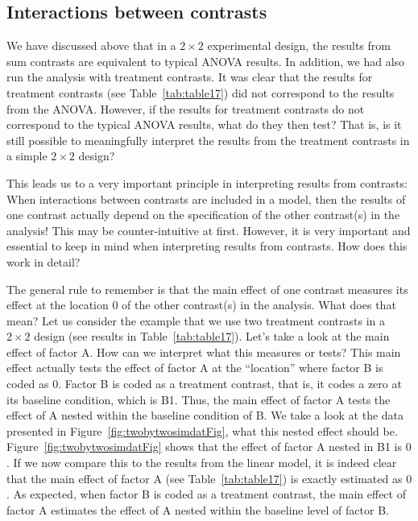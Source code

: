 \documentclass[
  12pt,
]{krantz}
\theoremstyle{definition}
\theoremstyle{definition}
\theoremstyle{definition}
\theoremstyle{definition}
\theoremstyle{remark}
\begin{document}
\hypertarget{interactions-between-contrasts}{%
\subsection{Interactions between contrasts}\label{interactions-between-contrasts}}

We have discussed above that in a \(2 \times 2\) experimental design, the results from sum contrasts are equivalent to typical ANOVA results. In addition, we had also run the analysis with treatment contrasts. It was clear that the results for treatment contrasts (see Table~\ref{tab:table17}) did not correspond to the results from the ANOVA. However, if the results for treatment contrasts do not correspond to the typical ANOVA results, what do they then test? That is, is it still possible to meaningfully interpret the results from the treatment contrasts in a simple \(2 \times 2\) design?

This leads us to a very important principle in interpreting results from contrasts: When interactions between contrasts are included in a model, then the results of one contrast actually depend on the specification of the other contrast(s) in the analysis! This may be counter-intuitive at first. However, it is very important and essential to keep in mind when interpreting results from contrasts. How does this work in detail?

The general rule to remember is that the main effect of one contrast measures its effect at the location \(0\) of the other contrast(s) in the analysis. What does that mean? Let us consider the example that we use two treatment contrasts in a \(2 \times 2\) design (see results in Table~\ref{tab:table17}). Let's take a look at the main effect of factor A. How can we interpret what this measures or tests? This main effect actually tests the effect of factor A at the ``location'' where factor B is coded as \(0\). Factor B is coded as a treatment contrast, that is, it codes a zero at its baseline condition, which is B1. Thus, the main effect of factor A tests the effect of A nested within the baseline condition of B. We take a look at the data presented in Figure~\ref{fig:twobytwosimdatFig}, what this nested effect should be. Figure~\ref{fig:twobytwosimdatFig} shows that the effect of factor A nested in B1 is \(0\). If we now compare this to the results from the linear model, it is indeed clear that the main effect of factor A (see Table~\ref{tab:table17}) is exactly estimated as \(0\). As expected, when factor B is coded as a treatment contrast, the main effect of factor A estimates the effect of A nested within the baseline level of factor B.
\end{document}
